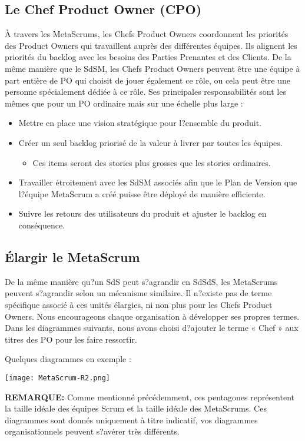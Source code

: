 \documentclass[12pt,a4paper,parskip=full]{scrartcl}
\begin{document}
\subsection{Le Chef Product Owner (CPO)}
À travers les MetaScrums, les Chefs Product Owners coordonnent les priorités des
Product Owners qui travaillent auprès des différentes équipes. Ils alignent les priorités du
backlog avec les besoins des Parties Prenantes et des Clients. De la même manière que
le SdSM, les Chefs Product Owners peuvent être une équipe à part entière de PO qui
choisit de jouer également ce rôle, ou cela peut être une personne spécialement dédiée à
ce rôle. Ses principales responsabilités sont les mêmes que pour un PO ordinaire mais sur
une échelle plus large :
\begin{itemize}
\item Mettre en place une vision stratégique pour l?ensemble du produit.
\item Créer un seul backlog priorisé de la valeur à livrer par toutes les équipes.
\begin{itemize}
\item Ces items seront des stories plus grosses que les stories ordinaires.
\end{itemize}
\item Travailler étroitement avec les SdSM associés afin que le Plan de Version que
l?équipe MetaScrum a créé puisse être déployé de manière efficiente.
\item Suivre les retours des utilisateurs du produit et ajuster le backlog en
conséquence.
\end{itemize}

\subsection{Élargir le MetaScrum}
De la même manière qu?un SdS peut s?agrandir en SdSdS, les MetaScrums peuvent
s?agrandir selon un mécanisme similaire. Il n?existe pas de terme spécifique associé à ces
unités élargies, ni non plus pour les Chefs Product Owners. Nous encourageons chaque
organisation à développer ses propres termes. Dans les diagrammes suivants, nous
avons choisi d?ajouter le terme « Chef » aux titres des PO pour les faire ressortir.

Quelques diagrammes en exemple :

\texttt{[image: MetaScrum-R2.png]}

\textbf{REMARQUE:} Comme mentionné précédemment, ces pentagones représentent la taille
idéale des équipes Scrum et la taille idéale des MetaScrums. Ces diagrammes sont
donnés uniquement à titre indicatif, vos diagrammes organisationnels peuvent s?avérer
très différents.
\end{document}
